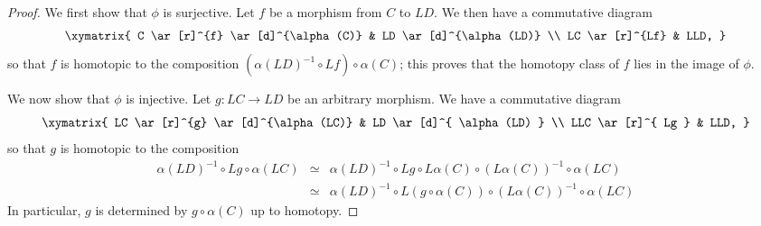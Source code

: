\begin{proof}
We first show that $\phi$ is surjective. Let $f$ be a morphism from $C$ to $LD$. We then have a commutative diagram
$$ \xymatrix{ C \ar[r]^{f} \ar[d]^{\alpha(C)} & LD \ar[d]^{\alpha(LD)} \\
LC \ar[r]^{Lf} & LLD, }$$
so that $f$ is homotopic to the composition $(\alpha(LD)^{-1} \circ Lf) \circ \alpha(C)$; this proves that the homotopy class of $f$ lies in the image of $\phi$.

We now show that $\phi$ is injective. Let $g: LC \rightarrow LD$ be an arbitrary morphism. 
We have a commutative diagram
$$ \xymatrix{ LC \ar[r]^{g} \ar[d]^{\alpha(LC)} & LD \ar[d]^{ \alpha(LD) } \\
LLC \ar[r]^{ Lg } & LLD, }$$
so that $g$ is homotopic to the composition
\begin{eqnarray*}
\alpha(LD)^{-1} \circ Lg \circ \alpha(LC) & 
\simeq & \alpha(LD)^{-1} \circ Lg \circ L \alpha(C) \circ (L\alpha(C))^{-1} \circ \alpha(LC) \\
& \simeq & \alpha(LD)^{-1} \circ L( g \circ \alpha(C) ) \circ (L \alpha(C))^{-1} \circ \alpha(LC)
\end{eqnarray*}
In particular, $g$ is determined by $g \circ \alpha(C)$ up to homotopy.

\end{proof}

